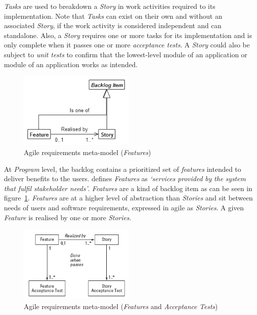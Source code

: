 \documentclass[dissertation,final]{softeng}
\begin{document}
\emph{Tasks} are used to breakdown a \emph{Story} in work activities required to its implementation. Note that \emph{Tasks} can exist on their own and without an associated \emph{Story}, if the work activity is considered independent and can standalone. Also, a \emph{Story} requires one or more tasks for its implementation and is only complete when it passes one or more \emph{acceptance tests}. A \emph{Story} could also be subject to \emph{unit tests} to confirm that the lowest-level module of an application or module of an application works as intended.

\begin{figure}[!h]
\includegraphics[width=0.50\textwidth]{metamodel_features2}
\centering
\caption{Agile requirements meta-model (\emph{Features})}
\label{fig:metamodel_features}
\end{figure}

At \emph{Program} level, the backlog contains a prioritized set of \emph{features} intended to deliver benefits to the users. \citet{Leffingwell2011} defines \emph{Features} as \emph{`services provided by the system that fulfil stakeholder needs'}. \emph{Features} are a kind of backlog item as can be seen in figure~\ref{fig:metamodel_features}. \emph{Features} are at a higher level of abstraction than \emph{Stories} and sit between needs of users and software requirements, expressed in agile as \emph{Stories}. A given \emph{Feature} is realised by one or more \emph{Stories}.

\begin{figure}[h]
\includegraphics[width=0.50\textwidth]{metamodel_features_tests}
\centering
\caption{Agile requirements meta-model (\emph{Features} and \emph{Acceptance Tests})}
\label{fig:metamodel_features_tests}
\end{figure}
\end{document}
